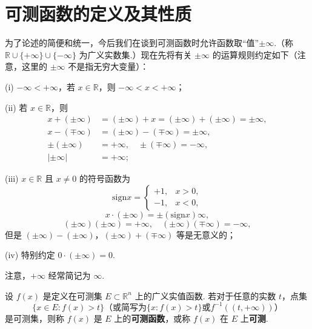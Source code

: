 \documentclass[../../main.tex]{subfiles}%
\begin{document}
\section{可测函数的定义及其性质}

为了论述的简便和统一，今后我们在谈到可测函数时允许函数取“值”\(\pm\infty\).（称 \(\mathbb{R}\cup\{+\infty\}\cup\{-\infty\}\) 为广义实数集.）现在先将有关 \(\pm\infty\) 的运算规则约定如下（注意，这里的 \(\pm\infty\) 不是指无穷大变量）：

(i) \(-\infty < +\infty\)，若 \(x \in \mathbb{R}\)，则 \(-\infty < x < +\infty\)；

(ii) 若 \(x \in \mathbb{R}\)，则
\begin{align*}
x + (\pm\infty) &= (\pm\infty) + x = (\pm\infty) + (\pm\infty) = \pm\infty,\\
x - (\mp\infty) &= (\pm\infty) - (\mp\infty) = \pm\infty,\\
\pm(\pm\infty) &= +\infty, \quad \pm(\mp\infty) = -\infty,\\
|\pm\infty| &= +\infty;
\end{align*}

(iii) \(x \in \mathbb{R}\) 且 \(x \neq 0\) 的符号函数为
\[
\mathrm{sign}x = 
\begin{cases}
+1, & x > 0,\\
-1, & x < 0,
\end{cases}
\]
\[
x\cdot(\pm\infty) = \pm(\mathrm{sign}x)\infty,
\]
\[
(\pm\infty)(\pm\infty) = +\infty, \quad (\pm\infty)(\mp\infty) = -\infty,
\]
但是 \((\pm\infty) - (\pm\infty)\)，\((\pm\infty) + (\mp\infty)\) 等是无意义的；

(iv) 特别约定 \(0\cdot(\pm\infty) = 0\).

注意，\(+\infty\) 经常简记为 \(\infty\). 

\begin{definition}[可测函数]
设 \(f(x)\) 是定义在可测集 \(E \subset \mathbb{R}^n\) 上的广义实值函数. 若对于任意的实数 \(t\)，点集
\[
\{x \in E: f(x) > t\} \text{（或简写为} \{x: f(x) > t\} \text{或}f^{-1}((t,+\infty))\text{）}
\]
是可测集，则称 \(f(x)\) 是 \(E\) 上的\textbf{可测函数}，或称 \(f(x)\) 在 \(E\) 上\textbf{可测}. 
\end{definition}
\end{document}

